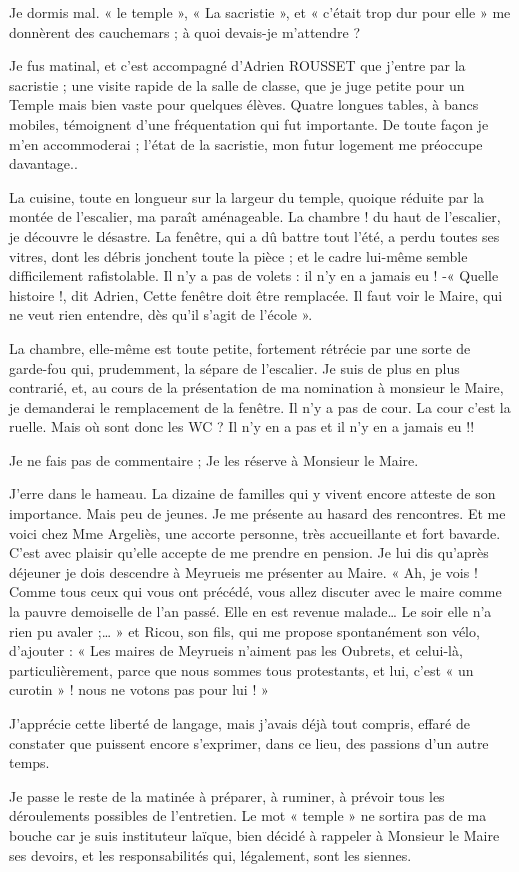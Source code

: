 
Je dormis mal. « le temple », « La sacristie », et « c’était trop dur pour elle » me
donnèrent des cauchemars ; à quoi devais-je m’attendre ?

Je fus matinal, et c’est accompagné d’Adrien ROUSSET que j’entre par la sacristie ;
une visite rapide de la salle de classe, que je juge petite pour un Temple mais bien
vaste pour quelques élèves. Quatre longues tables, à bancs mobiles, témoignent d’une
fréquentation qui fut importante. De toute façon je m’en accommoderai ; l’état de la
sacristie, mon futur logement me préoccupe davantage..

La cuisine, toute en longueur sur la largeur du temple, quoique réduite par la montée
de l’escalier, ma paraît aménageable. La chambre ! du haut de l’escalier, je découvre
le désastre. La fenêtre, qui a dû battre tout l’été, a perdu toutes ses vitres, dont les
débris jonchent toute la pièce ; et le cadre lui-même semble difficilement rafistolable.
Il n’y a pas de volets : il n’y en a jamais eu !
-« Quelle histoire !, dit Adrien, Cette fenêtre doit être remplacée. Il faut voir le
Maire, qui ne veut rien entendre, dès qu’il s’agit de l’école ».

La chambre, elle-même est toute petite, fortement rétrécie par une sorte de garde-fou
qui, prudemment, la sépare de l’escalier.
Je suis de plus en plus contrarié, et, au cours de la présentation de ma nomination à
monsieur le Maire, je demanderai le remplacement de la fenêtre.
Il n’y a pas de cour. La cour c’est la ruelle. Mais où sont donc les WC ? Il n’y en a
pas et il n’y en a jamais eu !!

Je ne fais pas de commentaire ; Je les réserve à Monsieur le Maire.

J’erre dans le hameau. La dizaine de familles qui y vivent encore atteste de son
importance. Mais peu de jeunes. Je me présente au hasard des rencontres. Et me voici
chez Mme Argeliès, une accorte personne, très accueillante et fort bavarde. C’est
avec plaisir qu’elle accepte de me prendre en pension. Je lui dis qu’après déjeuner je
dois descendre à Meyrueis me présenter au Maire.
« Ah, je vois ! Comme tous ceux qui vous ont précédé, vous allez discuter avec le
maire comme la pauvre demoiselle de l’an passé. Elle en est revenue malade… Le
soir elle n’a rien pu avaler ;… »
et Ricou, son fils, qui me propose spontanément son vélo, d’ajouter :
« Les maires de Meyrueis n’aiment pas les Oubrets, et celui-là, particulièrement,
parce que nous sommes tous protestants, et lui, c’est « un curotin » ! nous ne votons
pas pour lui ! »

J’apprécie cette liberté de langage, mais j’avais déjà tout compris, effaré de constater
que puissent encore s’exprimer, dans ce lieu, des passions d’un autre temps.

Je passe le reste de la matinée à préparer, à ruminer, à prévoir tous les déroulements
possibles de l’entretien. Le mot « temple » ne sortira pas de ma bouche car je suis
instituteur laïque, bien décidé à rappeler à Monsieur le Maire ses devoirs, et les
responsabilités qui, légalement, sont les siennes.
